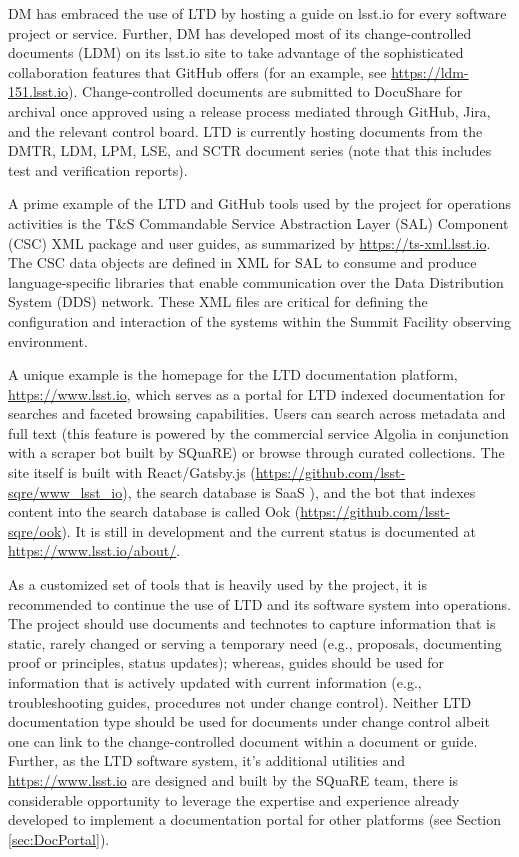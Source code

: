 DM has embraced the use of LTD by hosting a guide on lsst.io for every software project or service.
Further, DM has developed most of its change-controlled documents (LDM) on its lsst.io site to take advantage of the sophisticated collaboration features that GitHub offers (for an example, see \url{https://ldm-151.lsst.io}).
Change-controlled documents are submitted to DocuShare for archival once approved using a release process mediated through GitHub, Jira, and the relevant control board.
LTD is currently hosting documents from the DMTR, LDM, LPM, LSE, and SCTR document series (note that this includes test and verification reports).

A prime example of the LTD and GitHub tools used by the project for operations activities is the T\&S Commandable Service Abstraction Layer (SAL) Component (CSC) XML package and user guides, as summarized by \url{https://ts-xml.lsst.io}.
The CSC data objects are defined in XML for SAL to consume and produce language-specific libraries that enable communication over the Data Distribution System (DDS) network.
These XML files are critical for defining the configuration and interaction of the systems within the Summit Facility observing environment.

A unique example is the homepage for the LTD documentation platform, \url{https://www.lsst.io}, which serves as a portal for LTD indexed documentation for searches and faceted browsing capabilities. \citep{lsst.io-cite}
Users can search across metadata and full text (this feature is powered by the commercial service Algolia \citep{Algolia-cite} in conjunction with a scraper bot built by SQuaRE) or browse through curated collections.
The site itself is built with React/Gatsby.js (\url{https://github.com/lsst-sqre/www_lsst_io}), the search database is SaaS \citep{SaaS-cite}), and the bot that indexes content into the search database is called Ook (\url{https://github.com/lsst-sqre/ook}).
It is still in development and the current status is documented at \url{https://www.lsst.io/about/}.

As a customized set of tools that is heavily used by the project, it is recommended to continue the use of LTD and its software system into operations.
The project should use documents and technotes to capture information that is static, rarely changed or serving a temporary need (e.g., proposals, documenting proof or principles, status updates);
whereas, guides should be used for information that is actively updated with current information (e.g., troubleshooting guides, procedures not under change control).
Neither LTD documentation type should be used for documents under change control albeit one can link to the change-controlled document within a document or guide.
Further, as the LTD software system, it's additional utilities and \url{https://www.lsst.io} are designed and built by the SQuaRE team, there is considerable opportunity to leverage the expertise and experience already developed to implement a documentation portal for other platforms (see Section \ref{sec:DocPortal}).

